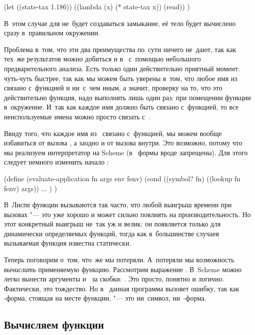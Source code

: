 \begin{code:lisp}
(let ((state-tax 1.186))
  ((lambda (x) (* state-tax x)) (read)) )
\end{code:lisp}

В~этом случае для  не~будет создаваться
замыкание, её тело будет вычислено сразу в~правильном окружении.

Проблема в~том, что эти два преимущества по~сути ничего не~дают, так как тех~же
результатов можно добиться и в~ с~помощью небольшого предварительного
анализа. Есть только один действительно приятный момент:  чуть-чуть
быстрее, так как мы можем быть уверены в~том, что любое имя из~ связано
с~функцией и ни~с~чем иным, а значит, проверку на то, что это действительно
функция, надо выполнять лишь один раз: при помещении функции в~окружение. И~так
как каждое имя должно быть связано с~функцией, то все неиспользуемые имена можно
просто связать с~.

Ввиду того, что каждое имя из~ связано с~функцией, мы можем вообще
избавиться от вызова , а заодно и от вызова  внутри.
Это возможно, потому что мы реализуем интерпретатор на Scheme (в~{\CommonLisp}
формы вроде  запрещены). Для этого следует немного
изменить начало :

\begin{code:lisp}
(define (evaluate-application fn args env fenv)
  (cond ((symbol? fn) ((lookup fn fenv) args))
        ... ) )
\end{code:lisp}

В~Лиспе функции вызываются так часто, что любой выигрыш времени при вызовах "---
это уже хорошо и может сильно повлиять на производительность. Но этот конкретный
выигрыш не~так уж и велик: он появляется только для динамически определяемых
функций, тогда как в~большинстве случаев вызываемая функция известна статически.

Теперь поговорим о~том, что~же мы потеряли. А~потеряли мы возможность
\emph{вычислить} применяемую функцию. Рассмотрим выражение . В~Scheme можно легко вынести аргументы  и~ за
скобки: . Это просто, понятно и логично.
Фактически, это тождество. Но в~ данная программа вызовет ошибку, так как
-форма, стоящая на месте функции, "--- это ни~символ,
ни~-форма.


\subsection{Вычисляем функции}\label{lisp1-2-omega/lisp2/ssect:eval-func-term}

